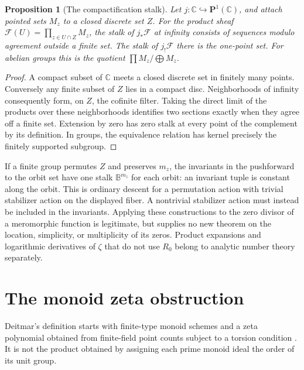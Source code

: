 \documentclass[11pt]{article}
\newcommand{\C}{\mathbb C}\newcommand{\B}{\mathbb B}
\newtheorem{proposition}[theorem]{Proposition}
\theoremstyle{definition}\newtheorem{definition}[theorem]{Definition}
\begin{document}
\begin{proposition}[The compactification stalk]\label{prop:tail}
Let $j:\C\hookrightarrow\mathbf P^1(\C)$, and attach pointed sets $M_z$ to a closed discrete set $Z$. For the product sheaf $\mathcal F(U)=\prod_{z\in U\cap Z}M_z$, the stalk of $j_*\mathcal F$ at infinity consists of sequences modulo agreement outside a finite set. The stalk of $j_!\mathcal F$ there is the one-point set. For abelian groups this is the quotient $\prod M_z/\bigoplus M_z$.
\end{proposition}
\begin{proof}
A compact subset of $\C$ meets a closed discrete set in finitely many points. Conversely any finite subset of $Z$ lies in a compact disc. Neighborhoods of infinity consequently form, on $Z$, the cofinite filter. Taking the direct limit of the products over these neighborhoods identifies two sections exactly when they agree off a finite set. Extension by zero has zero stalk at every point of the complement by its definition. In groups, the equivalence relation has kernel precisely the finitely supported subgroup.
\end{proof}

If a finite group permutes $Z$ and preserves $m_z$, the invariants in the pushforward to the orbit set have one stalk $\B^{m_z}$ for each orbit: an invariant tuple is constant along the orbit. This is ordinary descent for a permutation action with trivial stabilizer action on the displayed fiber. A nontrivial stabilizer action must instead be included in the invariants. Applying these constructions to the zero divisor of a meromorphic function is legitimate, but supplies no new theorem on the location, simplicity, or multiplicity of its zeros. Product expansions and logarithmic derivatives of $\zeta$ that do not use $R_0$ belong to analytic number theory separately.



\section{The monoid zeta obstruction}\label{sec:deitmar}
Deitmar's definition starts with finite-type monoid schemes and a zeta polynomial obtained from finite-field point counts subject to a torsion condition \citep[Theorem 1 and \S\S1--2]{Deitmar}. It is not the product obtained by assigning each prime monoid ideal the order of its unit group.


\end{document}
